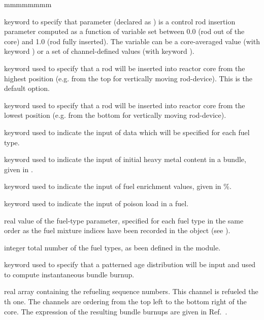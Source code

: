 \begin{ListeDeDescription}{mmmmmmmm}
\item[\moc{LEVEL}] keyword to specify that parameter  (declared as ) is a control rod insertion parameter computed as
a function of variable  set between 0.0 (rod out of the core) and 1.0 (rod fully inserted). The variable
 can be a core-averaged value (with keyword ) or a set of channel-defined values (with keyword ).

\item[\moc{H+}] keyword used to specify that a rod will be inserted into reactor core from the highest position (e.g. from the top for vertically moving rod-device).
This is the default option.

\item[\moc{H-}] keyword used to specify that a rod will be inserted into reactor core from the lowest position (e.g. from the bottom for vertically moving rod-device).

\item[\moc{FUEL}] keyword used to indicate the input of data which
will be specified for each fuel type.

\item[\moc{WEIGHT}] keyword used to indicate the input of initial heavy metal content
in a bundle, given in .

\item[\moc{ENRICH}] keyword used to indicate the input of fuel enrichment
values, given in \%.

\item[\moc{POISON}] keyword used to indicate the input of poison load
in a fuel.

\item[\dusa{fvalue}] real value of the fuel-type parameter, specified for each
fuel type in the same order as the fuel mixture indices have been recorded in
the  object (see ).

\item[\dusa{nfuel}] integer total number of the fuel types, as been
defined in the  module.

\item[\moc{CELL}] keyword used to specify that a patterned age distribution will be
input and used to compute instantaneous bundle burnup.

\item[\dusa{ialch}] real array containing the refueling sequence numbers. This channel
is refueled the th one. The channels are ordering from the top left to the bottom right of the core. The expression of the resulting bundle 
burnups are given in Ref.~.

\end{ListeDeDescription}
\clearpage
